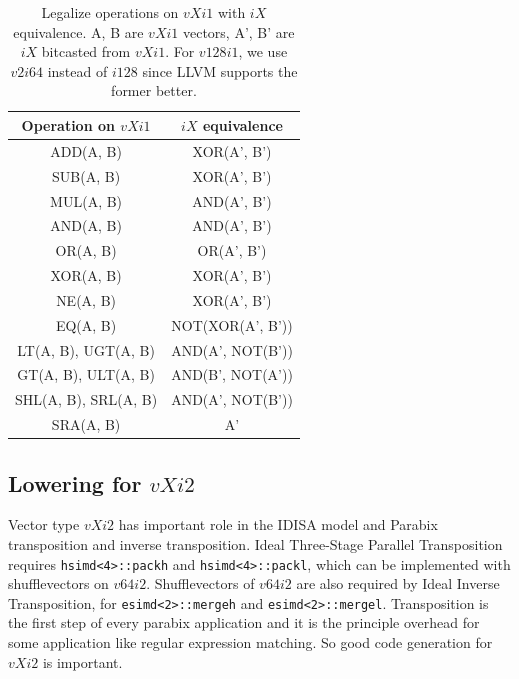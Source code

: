 \begin{table}
  \begin{center}
    \begin{tabular}{|c|c|}
      \hline
      Operation on $vXi1$ & $iX$ equivalence \\ \hline
      ADD(A, B) & XOR(A', B') \\ \hline
      SUB(A, B) & XOR(A', B') \\ \hline
      MUL(A, B) & AND(A', B') \\ \hline
      AND(A, B) & AND(A', B') \\ \hline
      OR(A, B) & OR(A', B') \\ \hline
      XOR(A, B) & XOR(A', B') \\ \hline
      NE(A, B) & XOR(A', B') \\ \hline
      EQ(A, B) & NOT(XOR(A', B')) \\\hline
      LT(A, B), UGT(A, B) & AND(A', NOT(B')) \\\hline
      GT(A, B), ULT(A, B) & AND(B', NOT(A')) \\\hline
      SHL(A, B), SRL(A, B) & AND(A', NOT(B')) \\\hline
      SRA(A, B) & A' \\\hline
    \end{tabular}
  \end{center}
\caption[Legalize operations on $vXi1$ with $iX$ equivalence.]{Legalize operations on $vXi1$ with $iX$ equivalence. A, B are $vXi1$ vectors, A', B' are $iX$ bitcasted from $vXi1$. For $v128i1$, we use $v2i64$ instead of $i128$ since LLVM supports the former better.}
\label{table:vxi1}
\end{table}

\subsection{Lowering for $vXi2$}
Vector type $vXi2$ has important role in the IDISA model and Parabix transposition and inverse transposition. Ideal Three-Stage Parallel Transposition\cite{transposition} requires \verb|hsimd<4>::packh| and \verb|hsimd<4>::packl|, which can be implemented with shufflevectors on $v64i2$. Shufflevectors of $v64i2$ are also required by Ideal Inverse Transposition, for \verb|esimd<2>::mergeh| and \verb|esimd<2>::mergel|. Transposition is the first step of every parabix application\cite{inductive_doubling_principle} and it is the principle overhead for some application like regular expression matching\cite{rob_regex}. So good code generation for $vXi2$ is important.

